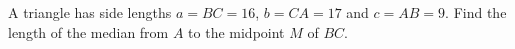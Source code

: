 A triangle has side lengths $a=BC=16$, $b=CA=17$ and $c=AB=9$. Find the length of the median from $A$ to the midpoint $M$ of $BC$.
